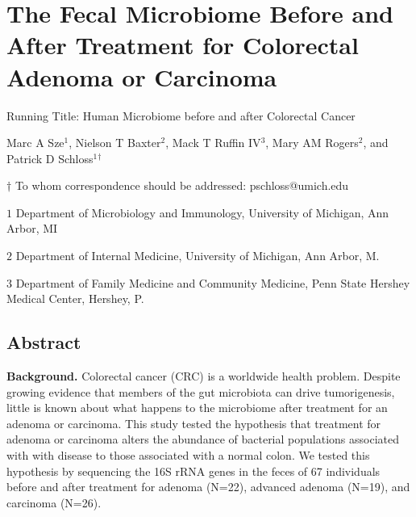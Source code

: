 \documentclass[12pt,]{article}
\title{}
\author{}
\date{}
\begin{document}
\section{The Fecal Microbiome Before and After Treatment for Colorectal
Adenoma or
Carcinoma}\label{the-fecal-microbiome-before-and-after-treatment-for-colorectal-adenoma-or-carcinoma}

\vspace{25mm}

\begin{center}
Running Title: Human Microbiome before and after Colorectal Cancer

\vspace{10mm}

Marc A Sze${^1}$, Nielson T Baxter${^2}$, Mack T Ruffin IV${^3}$, Mary AM Rogers${^2}$, and Patrick D Schloss${^1}$${^\dagger}$

\vspace{20mm}

$\dagger$ To whom correspondence should be addressed: pschloss@umich.edu

$1$ Department of Microbiology and Immunology, University of Michigan, Ann Arbor, MI

$2$ Department of Internal Medicine, University of Michigan, Ann Arbor, M.

$3$ Department of Family Medicine and Community Medicine, Penn State Hershey Medical Center, Hershey, P.


\end{center}

\newpage

\linenumbers

\subsection{Abstract}\label{abstract}

\textbf{Background.} Colorectal cancer (CRC) is a worldwide health
problem. Despite growing evidence that members of the gut microbiota can
drive tumorigenesis, little is known about what happens to the
microbiome after treatment for an adenoma or carcinoma. This study
tested the hypothesis that treatment for adenoma or carcinoma alters the
abundance of bacterial populations associated with with disease to those
associated with a normal colon. We tested this hypothesis by sequencing
the 16S rRNA genes in the feces of 67 individuals before and after
treatment for adenoma (N=22), advanced adenoma (N=19), and carcinoma
(N=26).
\end{document}
